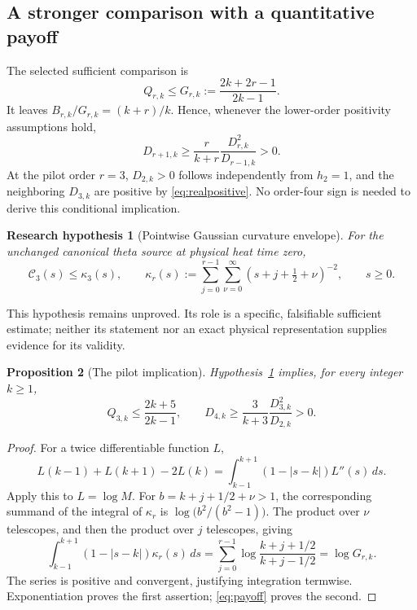 \documentclass[11pt,letterpaper]{article}
\numberwithin{equation}{section}
\newtheorem{proposition}{Proposition}[section]
\newtheorem{hypothesis}[proposition]{Research hypothesis}
\theoremstyle{remark}
\newcommand{\dd}{\,d}
\begin{document}
\subsection{A stronger comparison with a quantitative payoff}

The selected sufficient comparison is
\begin{equation}
 Q_{r,k}\le G_{r,k}:=\frac{2k+2r-1}{2k-1}. \label{eq:G}
\end{equation}
It leaves $B_{r,k}/G_{r,k}=(k+r)/k$. Hence, whenever the lower-order
positivity assumptions hold,
\begin{equation}
 D_{r+1,k}\ge\frac{r}{k+r}\frac{D_{r,k}^2}{D_{r-1,k}}>0.
 \label{eq:payoff}
\end{equation}
At the pilot order $r=3$, $D_{2,k}>0$ follows independently from
$h_2=1$, and the neighboring $D_{3,k}$ are positive by
\eqref{eq:realpositive}. No order-four sign is needed to derive this
conditional implication.

\begin{hypothesis}[Pointwise Gaussian curvature envelope]\label{hyp:gaussian}
For the unchanged canonical theta source at physical heat time zero,
\begin{equation}
 \mathcal C_3(s)\le\kappa_3(s),\qquad
 \kappa_r(s):=\sum_{j=0}^{r-1}\sum_{\nu=0}^\infty
                    (s+j+\tfrac12+\nu)^{-2},\qquad s\ge0.
 \label{eq:hypothesis}
\end{equation}
\end{hypothesis}
This hypothesis remains unproved. Its role is a specific, falsifiable
sufficient estimate; neither its statement nor an exact physical
representation supplies evidence for its validity.

\begin{proposition}[The pilot implication]
Hypothesis~\ref{hyp:gaussian} implies, for every integer $k\ge1$,
\begin{equation}
 Q_{3,k}\le\frac{2k+5}{2k-1},\qquad
 D_{4,k}\ge\frac{3}{k+3}\frac{D_{3,k}^2}{D_{2,k}}>0.
 \label{eq:pilot}
\end{equation}
\end{proposition}
\begin{proof}
For a twice differentiable function $L$,
\[
 L(k-1)+L(k+1)-2L(k)
 =\int_{k-1}^{k+1}(1-|s-k|)L''(s)\dd s.
\]
Apply this to $L=\log M$. For $b=k+j+1/2+\nu>1$, the corresponding
summand of the integral of $\kappa_r$ is
$\log\bigl(b^2/(b^2-1)\bigr)$. The product over $\nu$ telescopes,
and then the product over $j$ telescopes, giving
\begin{equation}
 \int_{k-1}^{k+1}(1-|s-k|)\kappa_r(s)\dd s
 =\sum_{j=0}^{r-1}\log\frac{k+j+1/2}{k+j-1/2}
 =\log G_{r,k}. \label{eq:triangle}
\end{equation}
The series is positive and convergent, justifying integration termwise.
Exponentiation proves the first assertion; \eqref{eq:payoff} proves the
second.
\end{proof}
\end{document}
